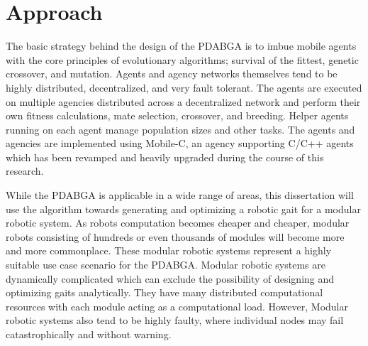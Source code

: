   \section{Approach} %
    The basic strategy behind the design of the PDABGA is to imbue mobile 
      agents with the core principles of evolutionary algorithms; survival 
      of the fittest, genetic crossover, and mutation. 
    Agents and agency networks themselves tend to be highly distributed, 
      decentralized, and very fault tolerant. 
    The agents are executed on multiple agencies distributed across a 
      decentralized network and perform their own fitness calculations, mate
      selection, crossover, and breeding. 
    Helper agents running on each agent manage population sizes and other
      tasks.   
    The agents and agencies are implemented using Mobile-C, an agency
      supporting C/C++ agents which has been revamped and heavily upgraded during
      the course of this research.

    While the PDABGA is applicable in a wide range of areas,
      this dissertation will use the algorithm towards generating and
      optimizing a robotic gait for a modular robotic system.
    As robots computation becomes cheaper and cheaper, modular robots
      consisting of hundreds or even thousands of modules will become 
      more and more commonplace.
    These modular robotic systems represent a highly suitable use case scenario
      for the PDABGA. 
    Modular robotic systems are dynamically complicated which can exclude the
      possibility of designing and optimizing gaits analytically. 
    They have many distributed computational resources with each module acting
      as a computational load.
    However, Modular robotic systems also tend to be highly faulty, where
      individual nodes may fail catastrophically and without warning.



